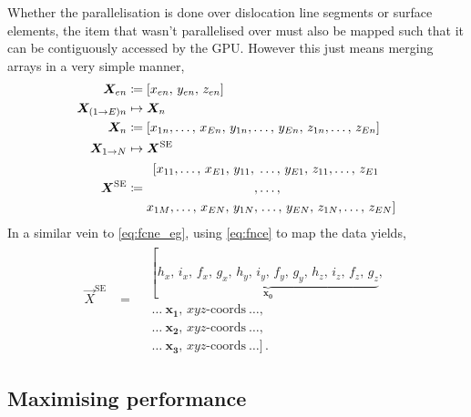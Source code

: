 Whether the parallelisation is done over dislocation line segments or surface elements, the item that wasn't parallelised over must also be mapped such that it can be contiguously accessed by the GPU. However this just means merging arrays in a very simple manner,
\begin{subequations}\label{eq:fnce}
    \begin{align}
        \vec{X}_{en}          & \coloneqq \left[x_{en},\, y_{en},\, z_{en}\right]                                                    \\
        \vec{X}_{(1\to E)n}   & \mapsto \vec{X}_{n} \nn
        \vec{X}_{n}           & \coloneqq \left[x_{1n},\ldots,\, x_{En},\, y_{1n},\ldots,\, y_{En},\, z_{1n},\ldots,\, z_{En}\right] \\
        \vec{X}_{1\to N}      & \mapsto \vec{X}^{\textrm{SE}}\nn
        \vec{X}^{\textrm{SE}} & \coloneqq
        \begin{aligned}
            \left[x_{11},\ldots,\, x_{E1},\, y_{11},\right. & \ldots,\, y_{E1},\, z_{11},\ldots,\, z_{E1}              \\
            ,                                               & \ldots,                                                  \\
            x_{1M},\ldots,\, x_{EN},\, y_{1N},              & \left.\ldots,\, y_{EN},\, z_{1N},\ldots,\, z_{EN}\right]
        \end{aligned}
    \end{align}
\end{subequations}
In a similar vein to \cref{eq:fcne_eg}, using \cref{eq:fnce} to map the data yields,
\begin{align}\label{eq:fnce_eg}
    \vec{X}^{\textrm{SE}} & = \begin{aligned}
         & \left[\underbrace{h_{x},\, i_{x},\, f_{x},\, g_{x},\,
            h_{y},\, i_{y},\, f_{y},\, g_{y},\,
        h_{z},\, i_{z},\, f_{z},\, g_{z}}_{\mathbf{x_{0}}}\right.,  \\
         & ~\ldots~\mathbf{x_{1}},\, xyz\textrm{-coords}~\ldots,    \\
         & ~\ldots~\mathbf{x_{2}},\, xyz\textrm{-coords}~\ldots,    \\
         & ~\ldots~\mathbf{x_{3}},\, xyz\textrm{-coords}~\ldots]\,.
    \end{aligned}
\end{align}

\subsection{Maximising performance}

